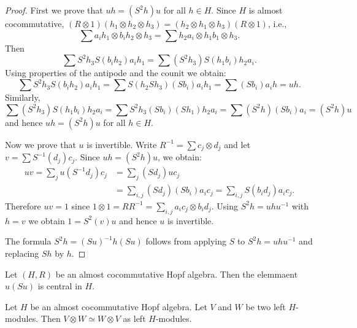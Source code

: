 \begin{proof}
First we prove that $uh=(S^2h)u$ for all $h\in H$. Since $H$ is almost cocommutative, 
$(R\otimes1)(h_1\otimes h_2\otimes h_3)=(h_2\otimes h_1\otimes h_3)(R\otimes1)$, i.e.,
\[
\sum a_ih_1\otimes b_ih_2\otimes h_3=\sum h_2a_i\otimes h_1b_1\otimes h_3.
\]
Then
\[
\sum S^2h_3S(b_ih_2)a_ih_1=\sum (S^2h_3)S(h_1b_i)h_2a_i.
\]
Using properties of the antipode and the counit we obtain: 
\[
\sum S^2h_3S(b_ih_2)a_ih_1=\sum S(h_2Sh_3)(Sb_i)a_ih_1= \sum (Sb_i)a_ih=uh.
\]
Similarly, 
\[
\sum (S^2h_3)S(h_1b_i)h_2a_i=\sum S^2h_3(Sb_i)(Sh_1)h_2a_i=\sum (S^2h)(Sb_i)a_i=(S^2h)u
\]
and hence $uh=(S^2h)u$ for all $h\in H$.

Now we prove that $u$ is invertible. Write $R^{-1}=\sum c_j\otimes d_j$ and
let $v=\sum S^{-1}(d_j)c_j$. Since $uh=(S^2h)u$, we obtain: 
\begin{align*}
uv=\sum_j u(S^{-1}d_j)c_j&=\sum_j (Sd_j)uc_j\\
&=\sum_{i,j} (Sd_j)(Sb_i)a_ic_j=\sum_{i,j} S(b_id_j)a_ic_j.
\end{align*}
Therefore $uv=1$ since $1\otimes1=RR^{-1}=\sum_{i,j}a_ic_j\otimes b_id_j$.
Using $S^2h=uhu^{-1}$ with $h=v$ we obtain $1=S^2(v)u$ and hence $u$ is
invertible. 

The formula $S^2h=(Su)^{-1}h(Su)$ follows from applying $S$ to
$S^2h=uhu^{-1}$ and replacing $Sh$ by $h$.
\end{proof}

\begin{corollary}
Let $(H,R)$ be an almost cocommutative Hopf algebra. Then the elemmaent $u(Su)$
is central in $H$.
\end{corollary}

\begin{exercise}
\label{exercise:VW=WV}
Let $H$ be an almost cocommutative Hopf algebra. Let $V$ and $W$ be two left
$H$-modules.  Then $V\otimes W\simeq W\otimes V$ as left $H$-modules.
\end{exercise}

